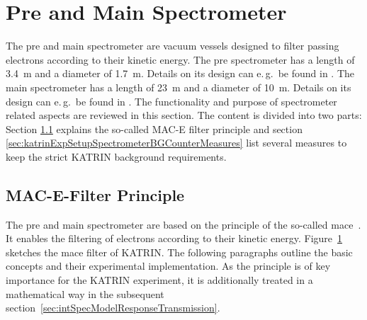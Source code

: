 \section{Pre and Main Spectrometer}
\label{sec:katrinExpSetupSpectrometer}
The pre and main spectrometer are vacuum vessels designed to filter passing electrons according to their kinetic energy. The pre spectrometer has a length of \SI{3.4}{m} and a diameter of \SI{1.7}{m}. Details on its design can e.\,g.~be found in \cite{Valerius2009,Fraenkle2010}. The main spectrometer has a length of \SI{23}{m} and a diameter of \SI{10}{m}. Details on its design can e.\,g.~be found in \cite{Valerius2009, Valerius2004}. The functionality and purpose of spectrometer related aspects are reviewed in this section. The content is divided into two parts: Section \ref{sec:katrinExpSetupSpectrometerMACE} explains the so-called MAC-E filter principle and section \ref{sec:katrinExpSetupSpectrometerBGCounterMeasures} list several measures to keep the strict KATRIN background requirements.

\subsection{MAC-E-Filter Principle}
\label{sec:katrinExpSetupSpectrometerMACE}
\begin{figure}[t]
	\label{fig:katrinExpSetupSpectrometer}
\end{figure}
The pre and main spectrometer are based on the principle of the so-called \gls{mace}~\cite{Beamson1980}. It enables the filtering of electrons according to their kinetic energy. Figure~\ref{fig:katrinExpSetupSpectrometer} sketches the \gls{mace} filter of KATRIN. The following paragraphs outline the basic concepts and their experimental implementation. As the principle is of key importance for the KATRIN experiment, it is additionally treated in a mathematical way in the subsequent section~\ref{sec:intSpecModelResponseTransmission}.

